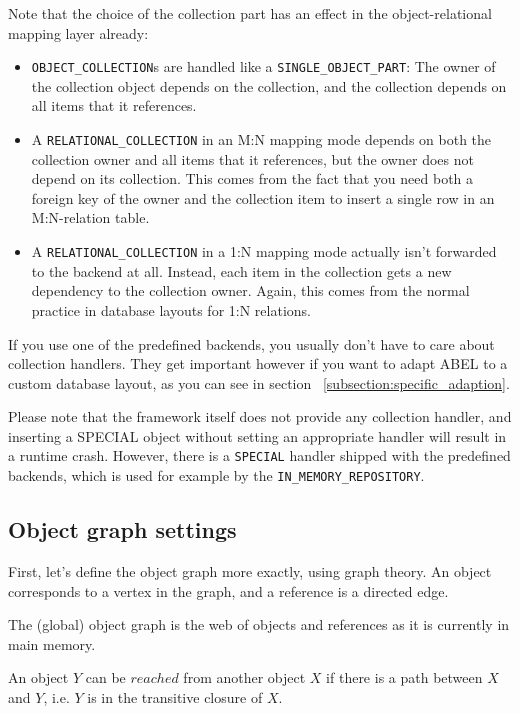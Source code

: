 Note that the choice of the collection part has an effect in the object-re\-la\-tio\-nal mapping layer already:
\begin{itemize}
 \item \lstinline!OBJECT_COLLECTION!s are handled like a \lstinline!SINGLE_OBJECT_PART!: The owner of the collection object depends on the collection, and the collection depends on all items that it references.
 \item A \lstinline!RELATIONAL_COLLECTION! in an M:N mapping mode depends on both the collection owner and all items that it references, but the owner does not depend on its collection.
 This comes from the fact that you need both a foreign key of the owner and the collection item to insert a single row in an M:N-relation table.
 \item A \lstinline!RELATIONAL_COLLECTION! in a 1:N mapping mode actually isn't forwarded to the backend at all. 
 Instead, each item in the collection gets a new dependency to the collection owner.
 Again, this comes from the normal practice in database layouts for 1:N relations.
\end{itemize}


If you use one of the predefined backends, you usually don't have to care about collection handlers.
They get important however if you want to adapt ABEL to a custom database layout, as you can see in section ~\ref{subsection:specific_adaption}.

Please note that the framework itself does not provide any collection handler, and inserting a SPECIAL object without setting an appropriate handler will result in a runtime crash.
However, there is a \lstinline!SPECIAL! handler shipped with the predefined backends, which is used for example by the \lstinline!IN_MEMORY_REPOSITORY!.

\subsection{Object graph settings}
\label{subsection:obect_graph_settings}

First, let's define the object graph more exactly, using graph theory.
An object corresponds to a vertex in the graph, and a reference is a directed edge.

The (global) object graph is the web of objects and references as it is currently in main memory.

An object $Y$ can be $reached$ from another object $X$ if there is a path between $X$ and $Y$, i.e. $Y$ is in the transitive closure of $X$.

